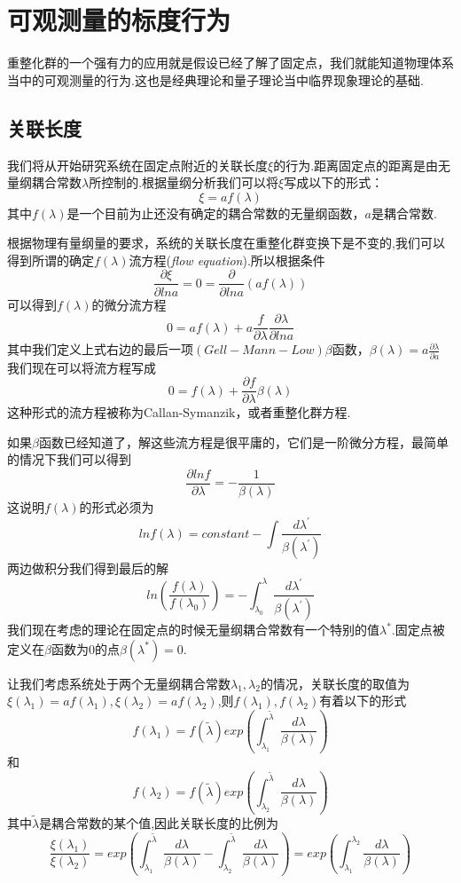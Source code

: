 \documentclass{ctexart}
\begin{document}
\section{可观测量的标度行为}
重整化群的一个强有力的应用就是假设已经了解了固定点，我们就能知道物理体系当中的可观测量的行为.这也是经典理论和量子理论当中临界现象理论的基础.
\subsection{关联长度}
我们将从开始研究系统在固定点附近的关联长度$\xi$的行为.距离固定点的距离是由无量纲耦合常数$\lambda$所控制的.根据量纲分析我们可以将$\xi$写成以下的形式：
$$\xi=af(\lambda)$$
其中$f(\lambda)$是一个目前为止还没有确定的耦合常数的无量纲函数，$a$是耦合常数.\par 
根据物理有量纲量的要求，系统的关联长度在重整化群变换下是不变的,我们可以得到所谓的确定$f(\lambda)$流方程(\textit{flow equation}).所以根据条件
$$\frac{\partial{\xi}}{\partial lna}=0=\frac{\partial}{\partial ln a}(af(\lambda))$$
可以得到$f(\lambda)$的微分流方程
$$0=af(\lambda)+a\frac{f}{\partial\lambda}\frac{\partial\lambda}{\partial lna}$$
其中我们定义上式右边的最后一项$(Gell-Mann-Low)\beta$函数，$\beta(\lambda)=a\frac{\partial \lambda}{\partial a}$
我们现在可以将流方程写成
$$0=f(\lambda)+\frac{\partial f}{\partial \lambda}\beta(\lambda)$$
这种形式的流方程被称为Callan-Symanzik，或者重整化群方程.\par 
如果$\beta$函数已经知道了，解这些流方程是很平庸的，它们是一阶微分方程，最简单的情况下我们可以得到
$$\frac{\partial ln f}{\partial \lambda}=-\frac{1}{\beta(\lambda)}$$
这说明$f(\lambda)$的形式必须为
$$lnf(\lambda)=constant-\int\frac{d\lambda^\prime}{\beta(\lambda^\prime)}$$
两边做积分我们得到最后的解
$$ln\left(\frac{f(\lambda)}{f(\lambda_0)}\right)=-\int_{\lambda_0}^{\lambda}\frac{d\lambda^\prime}{\beta(\lambda^\prime)}$$
我们现在考虑的理论在固定点的时候无量纲耦合常数有一个特别的值$\lambda^*$.固定点被定义在$\beta$函数为0的点$\beta(\lambda^*)=0$.\par 
让我们考虑系统处于两个无量纲耦合常数$\lambda_1,\lambda_2$的情况，关联长度的取值为$\xi(\lambda_1)=af(\lambda_1),\xi(\lambda_2)=af(\lambda_2)$,则$f(\lambda_1),f(\lambda_2)$有着以下的形式
$$f(\lambda_1)=f(\tilde{\lambda})exp\left(\int_{\lambda_1}^{\tilde{\lambda}}\frac{d\lambda}{\beta(\lambda)}\right)$$
和
$$f(\lambda_2)=f(\tilde{\lambda})exp\left(\int_{\lambda_2}^{\tilde{\lambda}}\frac{d\lambda}{\beta(\lambda)}\right)$$
其中$\tilde{\lambda}$是耦合常数的某个值,因此关联长度的比例为$$\frac{\xi(\lambda_1)}{\xi(\lambda_2)}=exp\left(\int_{\lambda_1}^{\tilde{\lambda}}\frac{d\lambda}{\beta(\lambda)}-\int_{\lambda_2}^{\tilde{\lambda}}\frac{d\lambda}{\beta(\lambda)}\right)=exp\left(\int_{\lambda_1}^{\lambda_2}\frac{d\lambda}{\beta(\lambda)}\right)$$
\end{document}
